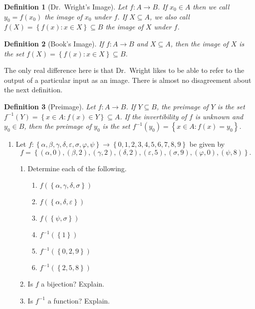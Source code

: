 \documentclass[12 pt]{article}
\newcommand{\set}[1]{\left\{#1\right\}}
\renewcommand{\subset}{\subseteq}
\newcommand{\esub}{\subseteq}
\theoremstyle{definition}
\theoremstyle{plain}
\theoremstyle{mytheorem}
\theoremstyle{myexample}
\theoremstyle{mydefinition}
\newtheorem*{definition*}{Definition}
\begin{document}
\begin{definition*}[Dr.~Wright's Image]  Let $f: A \to B$.  If $x_0 \in A$ then we call $y_0= f(x_0)$ the \textit{image} of $x_0$ under $f$.  If $X \esub A$, we also call $f(X) = \set{f(x): x\in X} \esub B$ the \textit{image} of $X$ under $f$.
\end{definition*}

\begin{definition*}[Book's Image] If $f: A \to B$ and $X \esub A$, then the \textit{image} of $X$ is the set $f(X) = \set{f(x):x \in X} \esub B$.
\end{definition*}

The only real difference here is that Dr.~Wright likes to be able to refer to the output of a particular input as an image.  There is almost no disagreement about the next definition.

\begin{definition*}[Preimage]  Let $f: A \to B$.  If $Y \esub B$, the \textit{preimage} of $Y$ is the set $f^{-1}(Y) = \set{x \in A:f(x) \in Y} \subset A$.  If the invertibility of $f$ is unknown and $y_0 \in B$, then the \textit{preimage} of $y_0$ is the set $f^{-1}(y_0) = \set{x \in A: f(x)=y_0}$.  
\end{definition*}

\begin{enumerate}[resume]
\item Let $f: \set{\alpha,\beta,\gamma,\delta,\varepsilon,\sigma,\varphi,\psi} \to \set{0,1,2,3,4,5,6,7,8,9}$ be given by
\[f = \set{(\alpha,0),(\beta,2),(\gamma,2),(\delta,2),(\varepsilon,5),(\sigma,9),(\varphi,0),(\psi,8)}.\]
	\begin{enumerate}
	\item Determine each of the following.
	\begin{enumerate}[label=(\roman*)] \itemsep=.3in
	\item $f(\set{\alpha,\gamma,\delta,\sigma})$
	\item $f(\set{\alpha,\delta,\varepsilon})$
	\item $f(\set{\psi,\sigma})$
	\item $f^{-1}(\set{1})$
	\item $f^{-1}(\set{0,2,9})$
	\item $f^{-1}(\set{2,5,8})$
	\end{enumerate}
	\item Is $f$ a bijection?  Explain.
	
	\vspace{2in}
	
	\item Is $f^{-1}$ a function?  Explain.
	
	\vspace{2in}
	\end{enumerate}
\end{enumerate}
\end{document}
